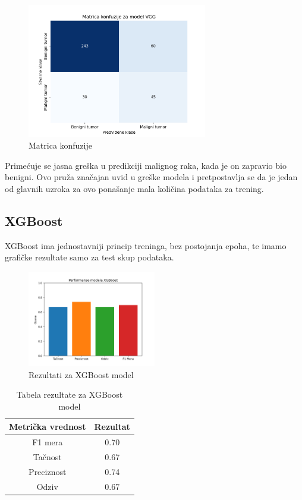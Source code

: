 \documentclass{article}
\begin{document}
\begin{figure}[H]
    \centering
    \includegraphics[width=0.7\textwidth]{rezultati/VGG_matrica_konfuzije.png} 
    \caption{Matrica konfuzije} 
    \label{VGG matrica konfuzije}
\end{figure}

Primećuje se jasna greška u predikciji malignog raka, kada je on zapravio bio benigni. Ovo pruža značajan uvid u greške modela i pretpostavlja se da je jedan od glavnih uzroka za ovo ponašanje mala količina podataka za trening.

\subsection{XGBoost}

XGBoost ima jednostavniji princip treninga, bez postojanja epoha, te imamo grafičke rezultate samo za test skup podataka.

\begin{figure}[H]
    \centering
    \includegraphics[width=0.5\textwidth]{rezultati/XGBoost_rezultati.png} 
    \caption{Rezultati za XGBoost model} 
    \label{XGBoost rezultati}
\end{figure}

\begin{table}[H]
    \centering
    \begin{tabular}{|c|c|}
        \hline
        \textbf{Metrička vrednost} & \textbf{Rezultat} \\ \hline
        F1 mera & 0.70 \\ \hline
        Tačnost & 0.67 \\ \hline
        Preciznost & 0.74 \\ \hline
        Odziv & 0.67 \\ \hline
    \end{tabular}
    \caption{Tabela rezultate za XGBoost model}
    \label{tab:XGBoost tabela rezultata}
\end{table}
\end{document}
